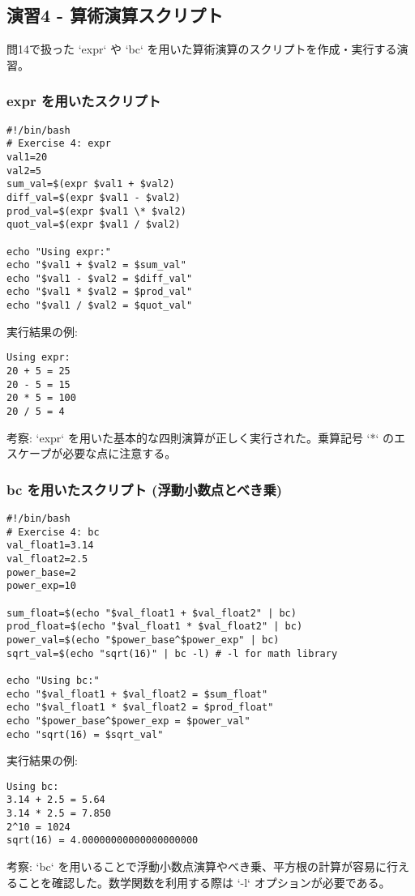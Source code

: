 \documentclass[a4paper,11pt]{jsarticle}
\begin{document}
\subsection*{演習4 - 算術演算スクリプト}
問14で扱った `expr` や `bc` を用いた算術演算のスクリプトを作成・実行する演習。
\subsubsection*{expr を用いたスクリプト}
\begin{lstlisting}[caption=演習4 exprのスクリプト例]
#!/bin/bash
# Exercise 4: expr
val1=20
val2=5
sum_val=$(expr $val1 + $val2)
diff_val=$(expr $val1 - $val2)
prod_val=$(expr $val1 \* $val2)
quot_val=$(expr $val1 / $val2)

echo "Using expr:"
echo "$val1 + $val2 = $sum_val"
echo "$val1 - $val2 = $diff_val"
echo "$val1 * $val2 = $prod_val"
echo "$val1 / $val2 = $quot_val"
\end{lstlisting}
実行結果の例:
\begin{verbatim}
Using expr:
20 + 5 = 25
20 - 5 = 15
20 * 5 = 100
20 / 5 = 4
\end{verbatim}
考察: `expr` を用いた基本的な四則演算が正しく実行された。乗算記号 `*` のエスケープが必要な点に注意する。

\subsubsection*{bc を用いたスクリプト (浮動小数点とべき乗)}
\begin{lstlisting}[caption=演習4 bcのスクリプト例]
#!/bin/bash
# Exercise 4: bc
val_float1=3.14
val_float2=2.5
power_base=2
power_exp=10

sum_float=$(echo "$val_float1 + $val_float2" | bc)
prod_float=$(echo "$val_float1 * $val_float2" | bc)
power_val=$(echo "$power_base^$power_exp" | bc)
sqrt_val=$(echo "sqrt(16)" | bc -l) # -l for math library

echo "Using bc:"
echo "$val_float1 + $val_float2 = $sum_float"
echo "$val_float1 * $val_float2 = $prod_float"
echo "$power_base^$power_exp = $power_val"
echo "sqrt(16) = $sqrt_val"
\end{lstlisting}
実行結果の例:
\begin{verbatim}
Using bc:
3.14 + 2.5 = 5.64
3.14 * 2.5 = 7.850
2^10 = 1024
sqrt(16) = 4.00000000000000000000
\end{verbatim}
考察: `bc` を用いることで浮動小数点演算やべき乗、平方根の計算が容易に行えることを確認した。数学関数を利用する際は `-l` オプションが必要である。
\end{document}
